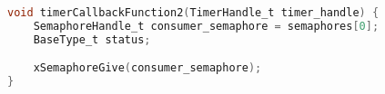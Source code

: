 \begin{lstlisting}[language=c,caption=Problem 6 Periodic Timer Callback Function, label=list:p6_timer]
void timerCallbackFunction2(TimerHandle_t timer_handle) {
    SemaphoreHandle_t consumer_semaphore = semaphores[0];
    BaseType_t status;

    xSemaphoreGive(consumer_semaphore);
}
\end{lstlisting}
